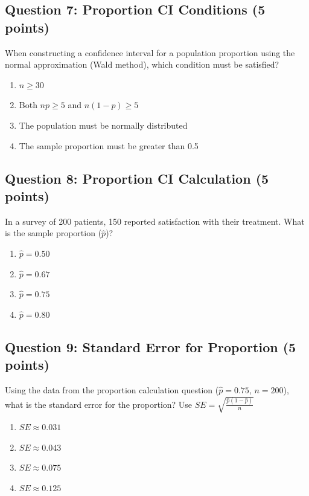 \documentclass[11pt]{article}
\begin{document}
\subsection*{Question 7: Proportion CI Conditions (5 points)}

When constructing a confidence interval for a population proportion using the normal approximation (Wald method), which condition must be satisfied?

\begin{enumerate}[label=\alph*)]
\item $n \geq 30$
\item Both $np \geq 5$ and $n(1-p) \geq 5$
\item The population must be normally distributed
\item The sample proportion must be greater than 0.5
\end{enumerate}

\subsection*{Question 8: Proportion CI Calculation (5 points)}

In a survey of 200 patients, 150 reported satisfaction with their treatment. What is the sample proportion ($\hat{p}$)?

\begin{enumerate}[label=\alph*)]
\item $\hat{p} = 0.50$
\item $\hat{p} = 0.67$
\item $\hat{p} = 0.75$
\item $\hat{p} = 0.80$
\end{enumerate}

\subsection*{Question 9: Standard Error for Proportion (5 points)}

Using the data from the proportion calculation question ($\hat{p} = 0.75$, $n = 200$), what is the standard error for the proportion? Use $SE = \sqrt{\frac{\hat{p}(1-\hat{p})}{n}}$

\begin{enumerate}[label=\alph*)]
\item $SE \approx 0.031$
\item $SE \approx 0.043$
\item $SE \approx 0.075$
\item $SE \approx 0.125$
\end{enumerate}
\end{document}
